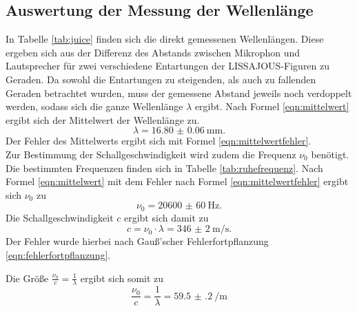 \subsection{Auswertung der Messung der Wellenlänge}
\label{sec:wellenlaenge}
In Tabelle \ref{tab:juice} finden sich die direkt gemessenen Wellenlängen. Diese ergeben sich aus der Differenz des Abstands zwischen Mikrophon und Lautsprecher für zwei verschiedene Entartungen der LISSAJOUS-Figuren zu Geraden.
Da sowohl die Entartungen zu steigenden, als auch zu fallenden Geraden betrachtet wurden, muss der gemessene Abstand jeweils noch verdoppelt werden, sodass sich die ganze Wellenlänge $\lambda$ ergibt.
Nach Formel \eqref{eqn:mittelwert} ergibt sich der Mittelwert der Wellenlänge zu.
\begin{equation}
	\label{eqn:wellenlänge}
	\lambda=\SI{16.80(6)}{\milli\metre}\text{.}
\end{equation}
Der Fehler des Mittelwerts ergibt sich mit Formel \eqref{eqn:mittelwertfehler}.\\
Zur Bestimmung der Schallgeschwindigkeit wird zudem die Frequenz $\nu_{0}$ benötigt.
Die bestimmten Frequenzen finden sich in Tabelle \ref{tab:ruhefrequenz}.
Nach Formel \eqref{eqn:mittelwert} mit dem Fehler nach Formel \eqref{eqn:mittelwertfehler} ergibt sich $\nu_0$ zu
\begin{equation}
	\label{eqn:rrrruhe}
	\nu_0=\SI{20600(60)}{\Hz}\text{.}
\end{equation}
Die Schallgeschwindigkeit $c$ ergibt sich damit zu
\begin{equation}
	\label{eqn:Schallgeschwindigkeit}
	c=\nu_0 \cdot\lambda=\SI{346(2)}{\meter\per\second}\text{.}
\end{equation}
Der Fehler wurde hierbei nach Gauß'scher Fehlerfortpflanzung \eqref{eqn:fehlerfortpflanzung}.

Die Größe $\frac{\nu_0}{c}=\frac{1}{\lambda}$ ergibt sich somit zu
\begin{equation}
	\label{eqn:wichtige_größe}
	\frac{\nu_0}{c}=\frac{1}{\lambda}=\SI{59.5(2)}{\per\meter}
\end{equation}


